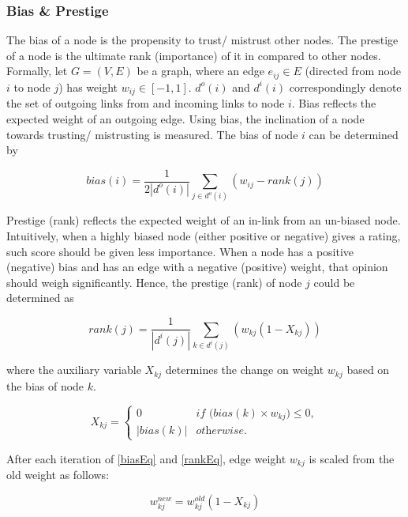 \documentclass[a4paper]{report}
\begin{document}
\subsubsection{Bias \& Prestige}
\par The bias of a node is the propensity to trust/ mistrust other nodes. The prestige of a node is the ultimate rank (importance) of it in compared to other nodes.
Formally, let $G=(V,E)$ be a graph, where an edge $e_{ij}\in E$ (directed from node $i$ to node $j$) has weight $w_{ij} \in [-1, 1]$. $d^o(i)$ and $d^i(i)$ correspondingly denote the set of outgoing links from and incoming links to node $i$. Bias reflects the expected weight of an outgoing edge. Using bias, the inclination of a node towards trusting/ mistrusting is measured. The bias of node $i$ can be determined by 
\begin{small}
\begin{equation} 
\label{biasEq}
bias(i) = \frac{1}{2|d^o(i)|}\sum_{j \in d^o(i)} (w_{ij} - rank(j))
\end{equation}
\end{small} 
Prestige (rank) reflects the expected weight of an in-link from an un-biased node. Intuitively, when a highly biased node (either positive or negative)  gives a rating, such score should be given less importance. When a node has a positive (negative) bias and has an edge with a negative (positive) weight, that opinion should weigh significantly. Hence, the prestige (rank) of node $j$ could be determined as
\begin{small}
\begin{equation}
\label{rankEq}
rank(j) = \frac{1}{|d^i(j)|}\sum_{k \in d^i(j)}(w_{kj}(1 - X_{kj}))
\end{equation}\end{small}
where the auxiliary variable $X_{kj}$ determines the change on weight $w_{kj}$ based on the bias of node $k$.
\begin{small}
\begin{equation}
\label{auxEq}
X_{kj}=\begin{cases}
0  & \textit{if ($bias(k) \times w_{kj}) \le 0$},\\
|bias(k)|  & \textit{otherwise}.
\end{cases}
\end{equation}
\end{small}
After each iteration of \ref{biasEq} and \ref{rankEq}, edge weight $w_{kj}$ is scaled from the old weight as follows:
\begin{small}
\begin{equation}
\label{weiEq}
w_{kj}^{new} = w_{kj}^{old}(1 - X_{kj}) 
\end{equation}
\end{small}
\end{document}
